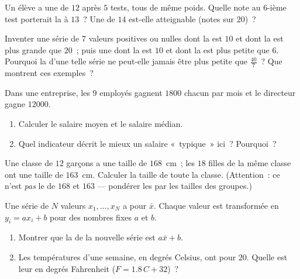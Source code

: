 \begin{exercise}[$\star\star$]\label{exo:g10:stats:5}
Un élève a une  de $12$ après $5$ tests, tous de même poids.
Quelle note au $6$-ième test porterait la  à $13$~? Une  de
$14$ est-elle atteignable (notes sur $20$)~?
\end{exercise}

\begin{exercise}[$\star\star$]\label{exo:g10:stats:6}
Inventer une série de $7$ valeurs positives ou nulles dont la  est
$10$ et dont la  est plus grande que $20$~; puis une dont la
 est $10$ et dont la  est plus petite que $6$. Pourquoi la
 d'une telle série ne peut-elle jamais être plus petite que
$\frac{40}{7}$~? Que montrent ces exemples~?
\end{exercise}

\begin{exercise}[$\star\star$]\label{exo:g10:stats:7}
Dans une entreprise, les $9$ employés gagnent $1800$ chacun par mois et
le directeur gagne $12000$.
\begin{enumerate}
  \item Calculer le salaire moyen et le salaire médian.
  \item Quel indicateur décrit le mieux un salaire «~typique~» ici~?
        Pourquoi~?
\end{enumerate}
\end{exercise}

\begin{exercise}[$\star\star$]\label{exo:g10:stats:8}
Une classe de $12$ garçons a une taille  de $168$~cm~; les $18$
filles de la même classe ont une taille  de $163$~cm. Calculer la
taille  de toute la classe. (Attention~: ce n'est \emph{pas} le
 de $168$ et $163$ --- pondérer les  par les tailles des
groupes.)
\end{exercise}

\begin{exercise}[$\star\star\star$]\label{exo:g10:stats:9}
Une série de $N$ valeurs $x_1, \dots, x_N$ a pour  $\bar x$.
Chaque valeur est transformée en $y_i = a x_i + b$ pour des nombres
fixes $a$ et $b$.
\begin{enumerate}
  \item Montrer que la  de la nouvelle série est $a \bar x + b$.
  \item Les températures d'une semaine, en degrés Celsius, ont pour
         $20$. Quelle est leur  en degrés Fahrenheit
        ($F = 1.8\,C + 32$)~?
\end{enumerate}
\end{exercise}

